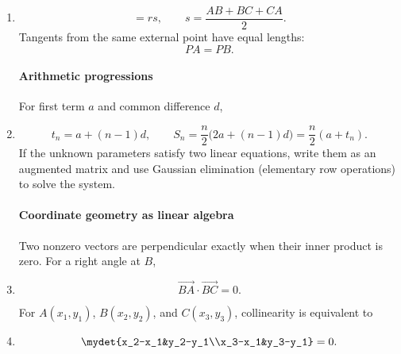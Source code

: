 \begin{enumerate}[label=\theenumi,leftmargin=4mm,itemsep=4pt]
\begin{equation}
\theta_{\mathrm{tangent-chord}}=\theta_{\mathrm{alternate\ segment}}.\label{eq:tangent-chord}
\end{equation}
For a triangle with inradius $r$ and semiperimeter $s$,
\setcounter{enumi}{5}\item

\begin{equation}
[ABC]=rs,\qquad s=\frac{AB+BC+CA}{2}.
\label{eq:triangle-inradius}
\end{equation}
Tangents from the same external point have equal lengths:
\begin{equation}
PA=PB.\label{eq:equal-tangents}
\end{equation}

\paragraph*{Arithmetic progressions}
For first term $a$ and common difference $d$,

\setcounter{enumi}{7}\item

\begin{equation}
t_n=a+(n-1)d,\qquad
S_n=\frac n2\bigl(2a+(n-1)d\bigr)=\frac n2(a+t_n).
\label{eq:ap}
\end{equation}
If the unknown parameters satisfy two linear equations, write them as an augmented matrix and use Gaussian elimination (elementary row operations) to solve the system.

\paragraph*{Coordinate geometry as linear algebra}
Two nonzero vectors are perpendicular exactly when their inner product is zero.
For a right angle at $B$,
\setcounter{enumi}{8}\item

\begin{equation}
\overrightarrow{BA}\cdot\overrightarrow{BC}=0.\label{eq:right-angle-dot}
\end{equation}

For $A(x_1,y_1)$, $B(x_2,y_2)$, and $C(x_3,y_3)$, collinearity is equivalent to

\setcounter{enumi}{9}\item

\begin{equation}
\mydet{x_2-x_1&y_2-y_1\\x_3-x_1&y_3-y_1}=0.
\label{eq:collinear-det}
\end{equation}


\end{enumerate}
